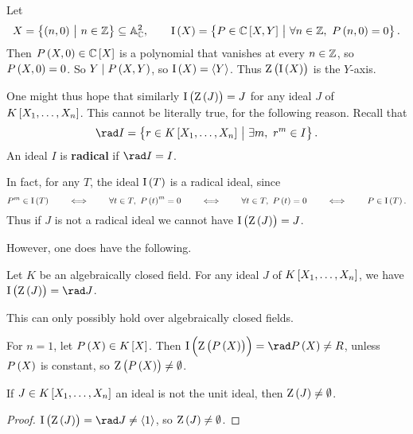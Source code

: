 \begin{example*}
Let
$$ X = \cbr{\br{n, 0} \st n \in \ZZ} \subseteq \AA_\CC^2, \qquad \I\br{X} = \cbr{P \in \CC\sbr{X, Y} \st \forall n \in \ZZ, \ P\br{n, 0} = 0}. $$
Then $ P\br{X, 0} \in \CC\sbr{X} $ is a polynomial that vanishes at every $ n \in \mathbb{Z} $, so $ P\br{X, 0} = 0 $. So $ Y \mid P\br{X, Y} $, so $ \I\br{X} = \abr{Y} $. Thus $ \Z\br{\I\br{X}} $ is the $ Y $-axis.
\end{example*}

One might thus hope that similarly $ \I\br{\Z\br{J}} = J $ for any ideal $ J $ of $ K\sbr{X_1, \dots, X_n} $. This cannot be literally true, for the following reason. Recall that
$$ \rad I = \cbr{r \in K\sbr{X_1, \dots, X_n} \st \exists m, \ r^m \in I}. $$
An ideal $ I $ is \textbf{radical} if $ \rad I = I $.

\begin{note*}
In fact, for any $ T $, the ideal $ \I\br{T} $ is a radical ideal, since
$$ P^m \in \I\br{T} \qquad \iff \qquad \forall t \in T, \ P\br{t}^m = 0 \qquad \iff \qquad \forall t \in T, \ P\br{t} = 0 \qquad \iff \qquad P \in \I\br{T}. $$
Thus if $ J $ is not a radical ideal we cannot have $ \I\br{\Z\br{J}} = J $.
\end{note*}

\pagebreak

However, one does have the following.

\begin{theorem}
\label{thm:13.2.5}
Let $ K $ be an algebraically closed field. For any ideal $ J $ of $ K\sbr{X_1, \dots, X_n} $, we have $ \I\br{\Z\br{J}} = \rad J $.
\end{theorem}

\begin{note*}
This can only possibly hold over algebraically closed fields.
\end{note*}

\begin{example*}
For $ n = 1 $, let $ P\br{X} \in K\sbr{X} $. Then $ \I\br{\Z\br{P\br{X}}} = \rad P\br{X} \ne R $, unless $ P\br{X} $ is constant, so $ \Z\br{P\br{X}} \ne \emptyset $.
\end{example*}

\begin{corollary}
If $ J \in K\sbr{X_1, \dots, X_n} $ an ideal is not the unit ideal, then $ \Z\br{J} \ne \emptyset $.
\end{corollary}

\begin{proof}
$ \I\br{\Z\br{J}} = \rad J \ne \abr{1} $, so $ \Z\br{J} \ne \emptyset $.
\end{proof}

